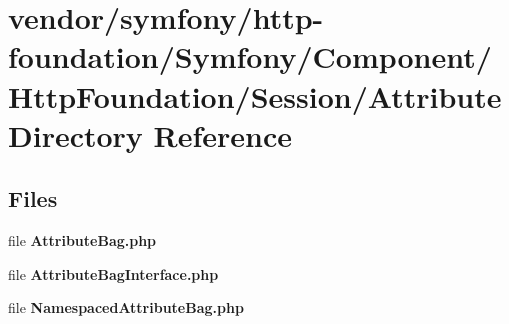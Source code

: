 \section{vendor/symfony/http-\/foundation/\+Symfony/\+Component/\+Http\+Foundation/\+Session/\+Attribute Directory Reference}
\label{dir_39961fb604d90658750d4aa697942021}
\subsection*{Files}
\begin{DoxyCompactItemize}
\item 
file {\bf Attribute\+Bag.\+php}
\item 
file {\bf Attribute\+Bag\+Interface.\+php}
\item 
file {\bf Namespaced\+Attribute\+Bag.\+php}
\end{DoxyCompactItemize}
